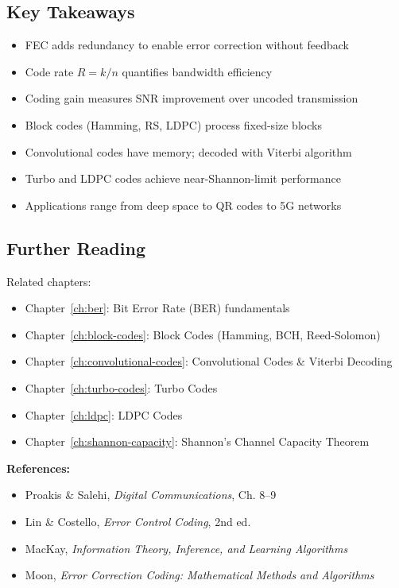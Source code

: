 \subsection{Key Takeaways}

\begin{itemize}
\item FEC adds redundancy to enable error correction without feedback
\item Code rate $R = k/n$ quantifies bandwidth efficiency
\item Coding gain measures SNR improvement over uncoded transmission
\item Block codes (Hamming, RS, LDPC) process fixed-size blocks
\item Convolutional codes have memory; decoded with Viterbi algorithm
\item Turbo and LDPC codes achieve near-Shannon-limit performance
\item Applications range from deep space to QR codes to 5G networks
\end{itemize}

\subsection{Further Reading}

Related chapters:
\begin{itemize}
\item Chapter~\ref{ch:ber}: Bit Error Rate (BER) fundamentals
\item Chapter~\ref{ch:block-codes}: Block Codes (Hamming, BCH, Reed-Solomon)
\item Chapter~\ref{ch:convolutional-codes}: Convolutional Codes \& Viterbi Decoding
\item Chapter~\ref{ch:turbo-codes}: Turbo Codes
\item Chapter~\ref{ch:ldpc}: LDPC Codes
\item Chapter~\ref{ch:shannon-capacity}: Shannon's Channel Capacity Theorem
\end{itemize}

\textbf{References:}
\begin{itemize}
\item Proakis \& Salehi, \textit{Digital Communications}, Ch. 8--9
\item Lin \& Costello, \textit{Error Control Coding}, 2nd ed.
\item MacKay, \textit{Information Theory, Inference, and Learning Algorithms}
\item Moon, \textit{Error Correction Coding: Mathematical Methods and Algorithms}
\end{itemize}
